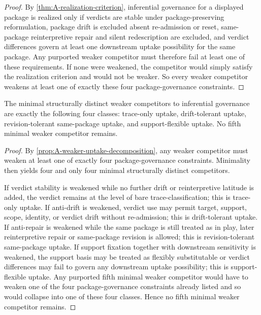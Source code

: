 \begin{proof}
By \cref{thm:A-realization-criterion}, inferential governance for a displayed package is realized only if verdicts are stable under package-preserving reformulation, package drift is excluded absent re-admission or reset, same-package reinterpretive repair and silent redescription are excluded, and verdict differences govern at least one downstream uptake possibility for the same package. Any purported weaker competitor must therefore fail at least one of these requirements. If none were weakened, the competitor would simply satisfy the realization criterion and would not be weaker. So every weaker competitor weakens at least one of exactly these four package-governance constraints.
\end{proof}

\begin{theorem}
\label{thm:A-weaker-uptake-exhaustion}
The minimal structurally distinct weaker competitors to inferential governance are exactly the following four classes: trace-only uptake, drift-tolerant uptake, revision-tolerant same-package uptake, and support-flexible uptake. No fifth minimal weaker competitor remains.
\end{theorem}

\begin{proof}
By \cref{prop:A-weaker-uptake-decomposition}, any weaker competitor must weaken at least one of exactly four package-governance constraints. Minimality then yields four and only four minimal structurally distinct competitors.

If verdict stability is weakened while no further drift or reinterpretive latitude is added, the verdict remains at the level of bare trace-classification; this is trace-only uptake. If anti-drift is weakened, verdict use may permit target, support, scope, identity, or verdict drift without re-admission; this is drift-tolerant uptake. If anti-repair is weakened while the same package is still treated as in play, later reinterpretive repair or same-package revision is allowed; this is revision-tolerant same-package uptake. If support fixation together with downstream sensitivity is weakened, the support basis may be treated as flexibly substitutable or verdict differences may fail to govern any downstream uptake possibility; this is support-flexible uptake. Any purported fifth minimal weaker competitor would have to weaken one of the four package-governance constraints already listed and so would collapse into one of these four classes. Hence no fifth minimal weaker competitor remains.
\end{proof}

